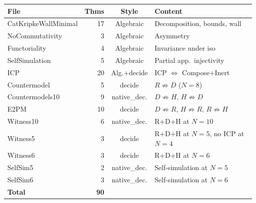 \documentclass[sigconf,screen,review,anonymous]{acmart}
\theoremstyle{remark}
\begin{document}
\medskip
{\small
\begin{tabular}{lrcl}
\textbf{File} & \textbf{Thms} & \textbf{Style} & \textbf{Content} \\
\hline
CatKripkeWallMinimal & 17 & Algebraic & Decomposition, bounds, wall \\
NoCommutativity      &  3 & Algebraic & Asymmetry \\
Functoriality        &  4 & Algebraic & Invariance under iso \\
SelfSimulation       &  5 & Algebraic & Partial app.\ injectivity \\
ICP                  & 20 & Alg.+decide & ICP $\Leftrightarrow$ Compose+Inert \\
Countermodel         &  5 & decide & $R \not\Rightarrow D$ ($N\!=\!8$) \\
Countermodels10      &  9 & native\_dec. & $D \not\Rightarrow H$, $H \not\Rightarrow D$ \\
E2PM                 & 10 & decide & $D \not\Rightarrow R$, $H \not\Rightarrow R$, $R \not\Rightarrow H$ \\
Witness10            &  6 & native\_dec. & R+D+H at $N\!=\!10$ \\
Witness5             &  3 & decide & R+D+H at $N\!=\!5$, no ICP at $N\!=\!4$ \\
Witness6             &  3 & decide & R+D+H at $N\!=\!6$ \\
SelfSim5             &  2 & native\_dec. & Self-simulation at $N\!=\!5$ \\
SelfSim6             &  3 & native\_dec. & Self-simulation at $N\!=\!6$ \\
\hline
\textbf{Total}       & \textbf{90} & & \\
\end{tabular}}
\end{document}

